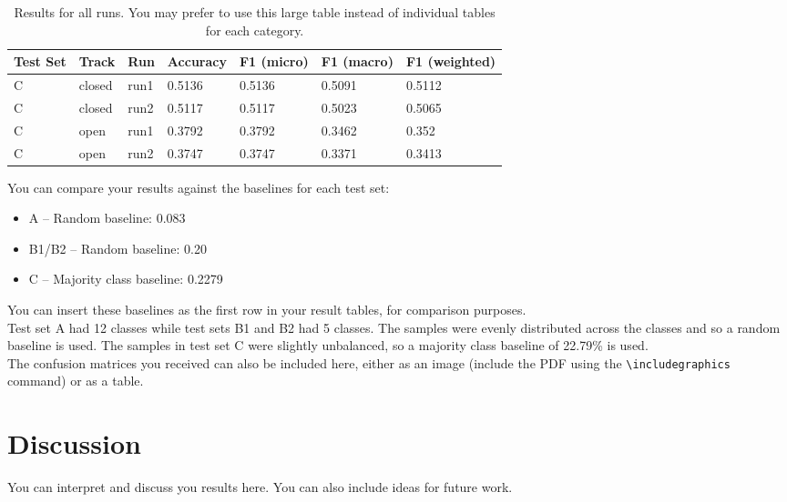 \documentclass[11pt]{article}
\begin{document}
\begin{table}[ht]
\center
\begin{tabular}{|lllllll|}
\hline
\bf Test Set & \bf Track & \bf Run & \bf Accuracy & \bf F1 (micro) & \bf F1 (macro) & \bf F1 (weighted) \\ 
\hline

C & closed & run1 & 0.5136 & 0.5136 & 0.5091 & 0.5112 \\
C & closed & run2 & 0.5117 & 0.5117 & 0.5023 & 0.5065 \\
C & open & run1 & 0.3792 & 0.3792 & 0.3462 & 0.352 \\
C & open & run2 & 0.3747 & 0.3747 & 0.3371 & 0.3413 \\
\hline
\end{tabular}
\caption{Results for all runs. You may prefer to use this large table instead of individual tables for each category.}
\label{tab:results-all}
\end{table}

You can compare your results against the baselines for each test set:

\begin{itemize}
\item A -- Random baseline: 0.083
\item B1/B2 -- Random baseline: 0.20
\item C -- Majority class baseline: 0.2279
\end{itemize}

You can insert these baselines as the first row in your result tables, for comparison purposes.
\\

Test set A had 12 classes while test sets B1 and B2 had 5 classes. The samples were evenly distributed across the classes and so a random baseline is used.
The samples in test set C were slightly unbalanced, so a majority class baseline of 22.79\% is used.
\\

The confusion matrices you received can also be included here, either as an image (include the PDF using the  \verb|\includegraphics| command) or as a table.

\clearpage %

\section{Discussion}

You can interpret and discuss you results here. You can also include ideas for future work.



\end{document}
